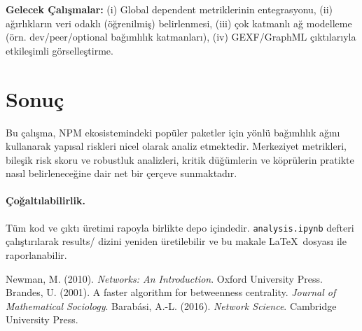 \documentclass[11pt,a4paper]{article}
\begin{document}
\textbf{Gelecek Çalışmalar:} (i) Global dependent metriklerinin entegrasyonu, (ii) ağırlıkların veri odaklı (öğrenilmiş) belirlenmesi, (iii) çok katmanlı ağ modelleme (örn. dev/peer/optional bağımlılık katmanları), (iv) GEXF/GraphML çıktılarıyla etkileşimli görselleştirme.

\section{Sonuç}
Bu çalışma, NPM ekosistemindeki popüler paketler için yönlü bağımlılık ağını kullanarak yapısal riskleri nicel olarak analiz etmektedir. Merkeziyet metrikleri, bileşik risk skoru ve robustluk analizleri, kritik düğümlerin ve köprülerin pratikte nasıl belirleneceğine dair net bir çerçeve sunmaktadır.

\paragraph{Çoğaltılabilirlik.} Tüm kod ve çıktı üretimi rapoyla birlikte depo içindedir. \texttt{analysis.ipynb} defteri çalıştırılarak results/ dizini yeniden üretilebilir ve bu makale \LaTeX~dosyası ile raporlanabilir.


\begin{thebibliography}{9}
 Newman, M. (2010). \emph{Networks: An Introduction}. Oxford University Press.
 Brandes, U. (2001). A faster algorithm for betweenness centrality. \emph{Journal of Mathematical Sociology}.
 Barabási, A.-L. (2016). \emph{Network Science}. Cambridge University Press.
\end{thebibliography}
\end{document}
